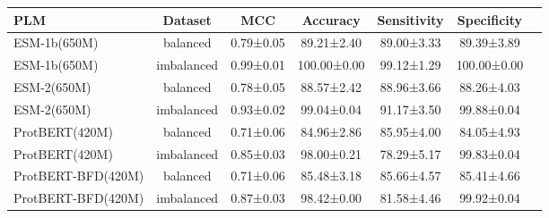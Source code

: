 \begin{tabular}{lcccccc}
\toprule
               PLM &    Dataset &       MCC &    Accuracy & Sensitivity & Specificity \\
\midrule
      ESM-1b(650M) &   balanced & 0.79±0.05 &  89.21±2.40 &  89.00±3.33 &  89.39±3.89 \\
      ESM-1b(650M) & imbalanced & 0.99±0.01 & 100.00±0.00 &  99.12±1.29 & 100.00±0.00 \\
       ESM-2(650M) &   balanced & 0.78±0.05 &  88.57±2.42 &  88.96±3.66 &  88.26±4.03 \\
       ESM-2(650M) & imbalanced & 0.93±0.02 &  99.04±0.04 &  91.17±3.50 &  99.88±0.04 \\
    ProtBERT(420M) &   balanced & 0.71±0.06 &  84.96±2.86 &  85.95±4.00 &  84.05±4.93 \\
    ProtBERT(420M) & imbalanced & 0.85±0.03 &  98.00±0.21 &  78.29±5.17 &  99.83±0.04 \\
ProtBERT-BFD(420M) &   balanced & 0.71±0.06 &  85.48±3.18 &  85.66±4.57 &  85.41±4.66 \\
ProtBERT-BFD(420M) & imbalanced & 0.87±0.03 &  98.42±0.00 &  81.58±4.46 &  99.92±0.04 \\
\bottomrule
\end{tabular}
